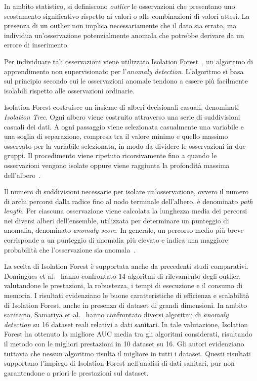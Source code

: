 \documentclass[a4paper,12pt]{report}
\begin{document}
In ambito statistico, si definiscono \textit{outlier} le osservazioni che presentano uno scostamento significativo rispetto ai valori o alle combinazioni di valori attesi. La presenza di un outlier non implica necessariamente che il dato sia errato, ma individua un'osservazione potenzialmente anomala che potrebbe derivare da un errore di inserimento.

Per individuare tali osservazioni viene utilizzato Isolation Forest~\cite{IF4781136, 10.1145/2133360.2133363}, un algoritmo di apprendimento non supervisionato per l'\textit{anomaly
detection}. L'algoritmo si basa sul principio secondo cui le osservazioni anomale tendono a essere più facilmente isolabili rispetto alle osservazioni ordinarie.

Isolation Forest costruisce un insieme di alberi decisionali casuali, denominati \textit{Isolation Tree}. Ogni albero viene costruito attraverso una serie di suddivisioni casuali dei dati. A ogni passaggio viene selezionata casualmente una variabile e una soglia di separazione, compresa tra il valore minimo e quello massimo osservato per la variabile selezionata, in modo da dividere le osservazioni in due gruppi. Il procedimento viene ripetuto ricorsivamente fino a quando le osservazioni vengono isolate oppure viene raggiunta la profondità massima dell'albero~\cite{IF4781136, 10.1145/2133360.2133363}.

Il numero di suddivisioni necessarie per isolare un'osservazione, ovvero il numero di archi percorsi dalla radice fino al nodo terminale dell'albero, è denominato \textit{path length}. Per ciascuna osservazione viene calcolata la lunghezza media dei percorsi nei diversi alberi dell'ensemble, utilizzata per determinare un punteggio di anomalia, denominato \textit{anomaly score}. In generale, un percorso medio più breve corrisponde a un punteggio di anomalia più elevato e indica una maggiore probabilità che l'osservazione sia anomala~\cite{IF4781136,10.1145/2133360.2133363}.

La scelta di Isolation Forest è supportata anche da precedenti studi comparativi. Domingues et al.~\cite{DOMINGUES2018406} hanno confrontato 14 algoritmi di rilevamento degli outlier, valutandone le prestazioni, la robustezza, i tempi di esecuzione e il consumo di memoria. I risultati evidenziano le buone caratteristiche di efficienza e scalabilità di Isolation Forest, anche in presenza di dataset di grandi dimensioni. In ambito sanitario, Samariya et al.~\cite{AnomalyDetectionEHR2023} hanno confrontato diversi algoritmi di \textit{anomaly detection} su 16 dataset reali relativi a dati sanitari. In tale valutazione, Isolation Forest ha ottenuto la migliore AUC media tra gli algoritmi considerati, risultando il metodo con le migliori prestazioni in 10 dataset su 16. Gli autori evidenziano tuttavia che nessun algoritmo risulta il migliore in tutti i dataset. Questi risultati supportano l'impiego di Isolation Forest nell'analisi di dati sanitari, pur non garantendone a priori le prestazioni sul dataset.
\end{document}
